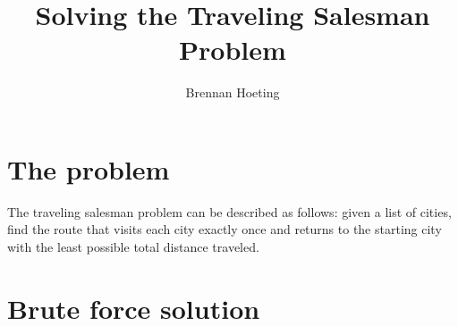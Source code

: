 \documentclass{article}
\begin{document}
\title{Solving the Traveling Salesman Problem}
\author{Brennan Hoeting}
\date{}
\maketitle 

\section{The problem}
The traveling salesman problem can be described as follows:
given a list of cities, find the route that visits each city
exactly once and returns to the starting city with the least possible total
distance traveled.  

\section{Brute force solution}


  
\end{document}
